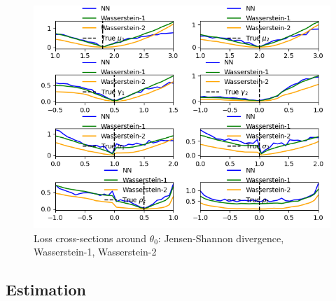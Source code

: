 \begin{figure}
    \includegraphics[width=\textwidth]{./Images/loss_plots narrow_crosshairs w1 w2 JS.png} %
    \caption{Loss cross-sections around $\theta_0$: Jensen-Shannon divergence, Wasserstein-1, Wasserstein-2}
    \label{fig:wasserstein_crosshairs}
\end{figure}

\subsection{Estimation}

